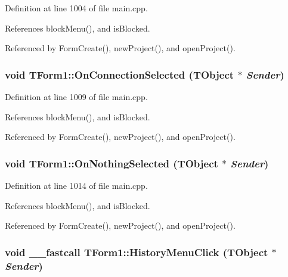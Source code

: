 Definition at line 1004 of file main.cpp.

References blockMenu(), and isBlocked.

Referenced by FormCreate(), newProject(), and openProject().\hypertarget{classTForm1_dcc5e70c6599d92da32b110ba459978c}{
\subsubsection[OnConnectionSelected]{\setlength{\rightskip}{0pt plus 5cm}void TForm1::OnConnectionSelected (TObject $\ast$ {\em Sender})}}
\label{classTForm1_dcc5e70c6599d92da32b110ba459978c}




Definition at line 1009 of file main.cpp.

References blockMenu(), and isBlocked.

Referenced by FormCreate(), newProject(), and openProject().\hypertarget{classTForm1_42c28a6bc0602d30253e83d138bb4964}{
\subsubsection[OnNothingSelected]{\setlength{\rightskip}{0pt plus 5cm}void TForm1::OnNothingSelected (TObject $\ast$ {\em Sender})}}
\label{classTForm1_42c28a6bc0602d30253e83d138bb4964}




Definition at line 1014 of file main.cpp.

References blockMenu(), and isBlocked.

Referenced by FormCreate(), newProject(), and openProject().\hypertarget{classTForm1_dfa4ff1b700ae559e155a6383d28f1be}{
\subsubsection[HistoryMenuClick]{\setlength{\rightskip}{0pt plus 5cm}void \_\-\_\-fastcall TForm1::HistoryMenuClick (TObject $\ast$ {\em Sender})}}
\label{classTForm1_dfa4ff1b700ae559e155a6383d28f1be}




